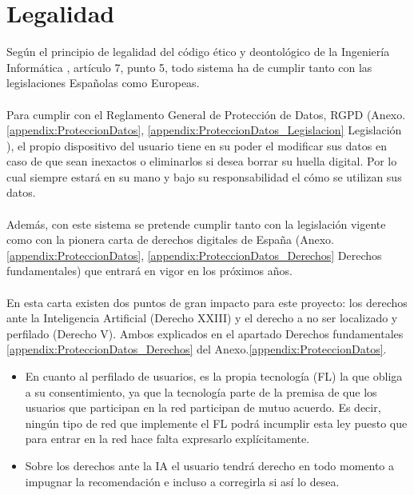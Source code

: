 \section{Legalidad}
Según el principio de legalidad del código ético y deontológico de la Ingeniería Informática \autocite{CodigoEticoDeontologicoa}, artículo 7, punto 5, todo sistema ha de cumplir tanto con las legislaciones Españolas como Europeas. 
\\\\
Para cumplir con el Reglamento General de Protección de Datos, RGPD (Anexo.\ref{appendix:ProteccionDatos}, \ref{appendix:ProteccionDatos_Legislacion} Legislación ), el propio dispositivo del usuario tiene en su poder el modificar sus datos en caso de que sean inexactos o eliminarlos si desea borrar su huella digital. Por lo cual siempre estará en su mano y bajo su responsabilidad el cómo se utilizan sus datos.
\\\\
Además, con este sistema se pretende cumplir tanto con la legislación vigente como con la pionera carta de derechos digitales de España (Anexo.\ref{appendix:ProteccionDatos}, \ref{appendix:ProteccionDatos_Derechos} Derechos fundamentales) que entrará en vigor en los próximos años. 
\\\\
En esta carta existen dos puntos de gran impacto para este proyecto: los derechos ante la Inteligencia Artificial (Derecho XXIII) y el derecho a no ser localizado y perfilado (Derecho V). Ambos explicados en el apartado Derechos fundamentales \ref{appendix:ProteccionDatos_Derechos} del Anexo.\ref{appendix:ProteccionDatos}.
\begin{itemize}
    \item En cuanto al perfilado de usuarios, es la propia tecnología (FL) la que obliga a su consentimiento, ya que la tecnología parte de la premisa de que los usuarios que participan en la red participan de mutuo acuerdo. Es decir, ningún tipo de red que implemente el FL podrá incumplir esta ley puesto que para entrar en la red hace falta expresarlo explícitamente.
    \item Sobre los derechos ante la IA el usuario tendrá derecho en todo momento a impugnar la recomendación e incluso a corregirla si así lo desea.
\end{itemize}

